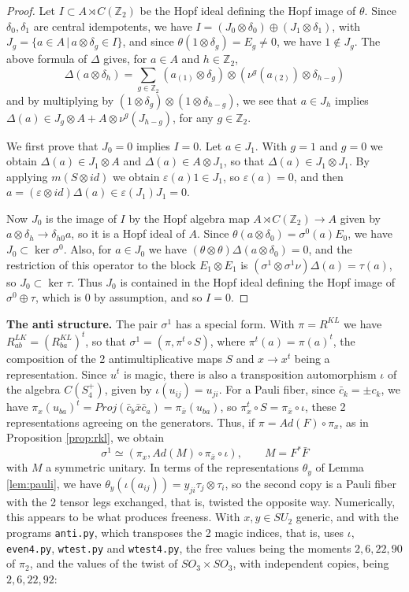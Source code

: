 \documentclass[11pt]{amsart}
\begin{document}
\begin{proof}
Let $I\subset A\rtimes C(\mathbb Z_2)$ be the Hopf ideal defining the Hopf image of $\theta$. Since $\delta_0,\delta_1$ are central idempotents, we have $I=(J_0\otimes\delta_0)\oplus(J_1\otimes\delta_1)$, with $J_g=\{a\in A\,|\,a\otimes\delta_g\in I\}$, and since $\theta(1\otimes\delta_g)=E_g\neq0$, we have $1\notin J_g$. The above formula of $\Delta$ gives, for $a\in A$ and $h\in\mathbb Z_2$,
$$\Delta(a\otimes\delta_h)=\sum_{g\in\mathbb Z_2}(a_{(1)}\otimes\delta_g)\otimes(\nu^g(a_{(2)})\otimes\delta_{h-g})$$
and by multiplying by $(1\otimes\delta_g)\otimes(1\otimes\delta_{h-g})$, we see that $a\in J_h$ implies $\Delta(a)\in J_g\otimes A+A\otimes\nu^g(J_{h-g})$, for any $g\in\mathbb Z_2$.

We first prove that $J_0=0$ implies $I=0$. Let $a\in J_1$. With $g=1$ and $g=0$ we obtain $\Delta(a)\in J_1\otimes A$ and $\Delta(a)\in A\otimes J_1$, so that $\Delta(a)\in J_1\otimes J_1$. By applying $m(S\otimes id)$ we obtain $\varepsilon(a)1\in J_1$, so $\varepsilon(a)=0$, and then $a=(\varepsilon\otimes id)\Delta(a)\in\varepsilon(J_1)J_1=0$.

Now $J_0$ is the image of $I$ by the Hopf algebra map $A\rtimes C(\mathbb Z_2)\to A$ given by $a\otimes\delta_h\to\delta_{h0}a$, so it is a Hopf ideal of $A$. Since $\theta(a\otimes\delta_0)=\sigma^0(a)E_0$, we have $J_0\subset\ker\sigma^0$. Also, for $a\in J_0$ we have $(\theta\otimes\theta)\Delta(a\otimes\delta_0)=0$, and the restriction of this operator to the block $E_1\otimes E_1$ is $(\sigma^1\otimes\sigma^1\nu)\Delta(a)=\tau(a)$, so $J_0\subset\ker\tau$. Thus $J_0$ is contained in the Hopf ideal defining the Hopf image of $\sigma^0\oplus\tau$, which is $0$ by assumption, and so $I=0$.
\end{proof}

\noindent\textbf{The anti structure.} The pair $\sigma^1$ has a special form. With $\pi=R^{KL}$ we have $R^{LK}_{ab}=(R^{KL}_{ba})^t$, so that $\sigma^1=(\pi,\pi^t\circ S)$, where $\pi^t(a)=\pi(a)^t$, the composition of the 2 antimultiplicative maps $S$ and $x\to x^t$ being a representation. Since $u^t$ is magic, there is also a transposition automorphism $\iota$ of the algebra $C(S_4^+)$, given by $\iota(u_{ij})=u_{ji}$. For a Pauli fiber, since $\bar{c}_k=\pm c_k$, we have $\pi_x(u_{ba})^t=Proj(\bar{c}_b\bar{x}\bar{c}_a)=\pi_{\bar{x}}(u_{ba})$, so $\pi_x^t\circ S=\pi_{\bar{x}}\circ\iota$, these 2 representations agreeing on the generators. Thus, if $\pi=Ad(F)\circ\pi_x$, as in Proposition \ref{prop:rkl}, we obtain
$$\sigma^1\simeq(\pi_x,Ad(M)\circ\pi_{\bar{x}}\circ\iota),\qquad M=F^*\bar{F}$$
with $M$ a symmetric unitary. In terms of the representations $\theta_y$ of Lemma \ref{lem:pauli}, we have $\theta_y(\iota(a_{ij}))=y_{ji}\tau_j\otimes\tau_i$, so the second copy is a Pauli fiber with the 2 tensor legs exchanged, that is, twisted the opposite way. Numerically, this appears to be what produces freeness. With $x,y\in SU_2$ generic, and with the programs \texttt{anti.py}, which transposes the 2 magic indices, that is, uses $\iota$, \texttt{even4.py}, \texttt{wtest.py} and \texttt{wtest4.py}, the free values being the moments $2,6,22,90$ of $\pi_2$, and the values of the twist of $SO_3\times SO_3$, with independent copies, being $2,6,22,92$:
\end{document}
